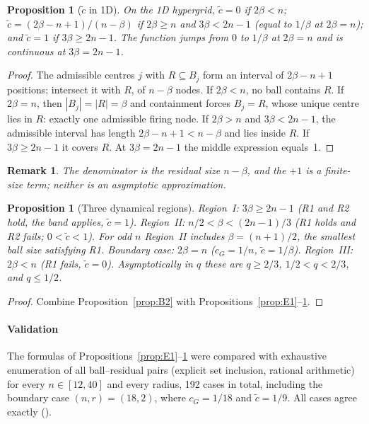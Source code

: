\documentclass[pdflatex,sn-mathphys-num]{sn-jnl}
\newcommand{\ContCases}{192}
\theoremstyle{thmstyleone}%
\newtheorem{proposition}[theorem]{Proposition}
\theoremstyle{thmstylethree}%
\theoremstyle{thmstyletwo}%
\newtheorem{remark}{Remark}[theorem]
\newcommand{\ctil}{\tilde{c}}
\newcommand{\cG}{c_G}
\begin{document}
\begin{proposition}[$\ctil$ in 1D]
\label{prop:E2}
On the 1D hypergrid,
$\ctil=0$ if $2\beta<n$;
$\ctil=(2\beta-n+1)/(n-\beta)$ if $2\beta\ge n$ and $3\beta<2n-1$
(equal to $1/\beta$ at $2\beta=n$);
and $\ctil=1$ if $3\beta\ge2n-1$. The function jumps from $0$ to $1/\beta$
at $2\beta=n$ and is continuous at $3\beta=2n-1$.
\end{proposition}
\begin{proof}
The admissible centres $j$ with $R\subseteq B_j$ form an interval of
$2\beta-n+1$ positions; intersect it with $R$, of $n-\beta$ nodes. If
$2\beta<n$, no ball contains $R$. If $2\beta=n$, then $|B_j|=|R|=\beta$
and containment forces $B_j=R$, whose unique centre lies in $R$: exactly
one admissible firing node. If $2\beta>n$ and $3\beta<2n-1$, the
admissible interval has length $2\beta-n+1<n-\beta$ and lies inside $R$.
If $3\beta\ge2n-1$ it covers $R$. At $3\beta=2n-1$ the middle expression
equals~1.
\end{proof}
\begin{remark}
\label{rem:E2.1}
The denominator is the residual size $n-\beta$, and the $+1$ is a
finite-size term; neither is an asymptotic approximation.
\end{remark}

\begin{proposition}[Three dynamical regions]
\label{prop:E3}
Region~I: $3\beta\ge2n-1$ (R1 and R2 hold, the band applies, $\ctil=1$).
Region~II: $n/2<\beta<(2n-1)/3$ (R1 holds and R2 fails;
$0<\ctil<1$). For odd $n$ Region~II includes $\beta=(n+1)/2$, the
smallest ball size satisfying R1.
Boundary case: $2\beta=n$ ($\cG=1/n$, $\ctil=1/\beta$).
Region~III: $2\beta<n$ (R1 fails, $\ctil=0$).
Asymptotically in $q$ these are $q\ge2/3$, $1/2<q<2/3$, and $q\le1/2$.
\end{proposition}
\begin{proof}
Combine Proposition~\ref{prop:B2} with
Propositions~\ref{prop:E1}--\ref{prop:E2}.
\end{proof}

\paragraph{Validation}
The formulas of Propositions~\ref{prop:E1}--\ref{prop:E2} were compared
with exhaustive enumeration of all ball--residual pairs (explicit set
inclusion, rational arithmetic) for every $n\in[12,40]$ and every radius,
\ContCases{} cases in total, including the boundary case $(n,r)=(18,2)$,
where $\cG=1/18$ and $\ctil=1/9$. All cases agree exactly
().
\end{document}
